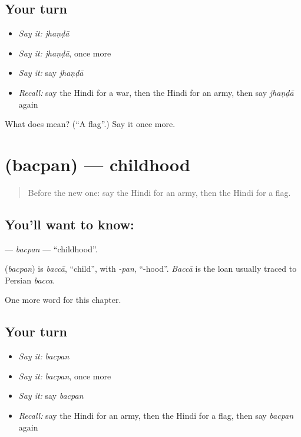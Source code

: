 \subsection*{Your turn}
\begin{itemize}
\raggedright
  \item \emph{Say it:} \emph{jhaṇḍā}
  \item \emph{Say it:} \emph{jhaṇḍā}, once more
  \item \emph{Say it:} say \emph{jhaṇḍā}
  \item \emph{Recall:} say the Hindi for a war, then the Hindi for an army, then say \emph{jhaṇḍā} again
\end{itemize}

\begin{tcolorbox}[breakable,colback=teal!4,colframe=teal!35!black,title={Before you move on}]
What does  mean? (\textquotedblleft{}A flag\textquotedblright{}.) Say it once more.
\end{tcolorbox}
\section[\texorpdfstring{\hi{बचपन} (bacpan)}{बचपन (bacpan)}]{ (bacpan) — childhood}

\label{lesson:HI-C220-bacpan}



\begin{quote}
Before the new one: say the Hindi for an army, then the Hindi for a flag.
\end{quote}

\subsection*{You'll want to know: }
\textbf{} — \emph{bacpan} — \textquotedblleft{}childhood\textquotedblright{}.

\begin{cousinweb}
\textbf{} (\emph{bacpan}) is \emph{baccā}, \textquotedblleft{}child\textquotedblright{}, with \emph{-pan}, \textquotedblleft{}-hood\textquotedblright{}. \emph{Baccā} is the loan usually traced to Persian \emph{bacca}.
\end{cousinweb}

\begin{grammarlens}[title={What you've built}]
One more word for this chapter.
\end{grammarlens}

\subsection*{Your turn}
\begin{itemize}
\raggedright
  \item \emph{Say it:} \emph{bacpan}
  \item \emph{Say it:} \emph{bacpan}, once more
  \item \emph{Say it:} say \emph{bacpan}
  \item \emph{Recall:} say the Hindi for an army, then the Hindi for a flag, then say \emph{bacpan} again
\end{itemize}

